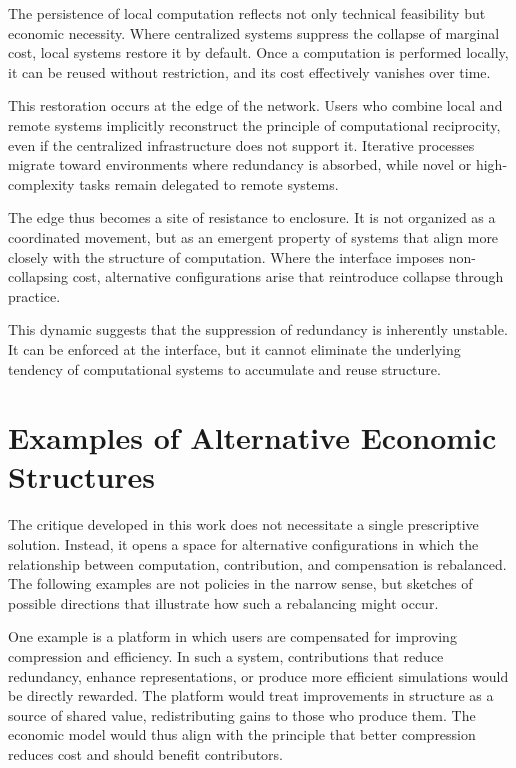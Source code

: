 \documentclass[12pt, oneside]{article}
\begin{document}
The persistence of local computation reflects not only technical feasibility but economic necessity. Where centralized systems suppress the collapse of marginal cost, local systems restore it by default. Once a computation is performed locally, it can be reused without restriction, and its cost effectively vanishes over time.

This restoration occurs at the edge of the network. Users who combine local and remote systems implicitly reconstruct the principle of computational reciprocity, even if the centralized infrastructure does not support it. Iterative processes migrate toward environments where redundancy is absorbed, while novel or high-complexity tasks remain delegated to remote systems.

The edge thus becomes a site of resistance to enclosure. It is not organized as a coordinated movement, but as an emergent property of systems that align more closely with the structure of computation. Where the interface imposes non-collapsing cost, alternative configurations arise that reintroduce collapse through practice.

This dynamic suggests that the suppression of redundancy is inherently unstable. It can be enforced at the interface, but it cannot eliminate the underlying tendency of computational systems to accumulate and reuse structure.

\section{Examples of Alternative Economic Structures}

The critique developed in this work does not necessitate a single prescriptive solution. Instead, it opens a space for alternative configurations in which the relationship between computation, contribution, and compensation is rebalanced. The following examples are not policies in the narrow sense, but sketches of possible directions that illustrate how such a rebalancing might occur.

One example is a platform in which users are compensated for improving compression and efficiency. In such a system, contributions that reduce redundancy, enhance representations, or produce more efficient simulations would be directly rewarded. The platform would treat improvements in structure as a source of shared value, redistributing gains to those who produce them. The economic model would thus align with the principle that better compression reduces cost and should benefit contributors.
\end{document}
